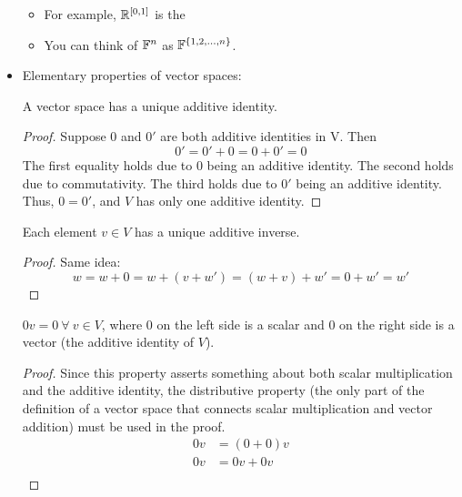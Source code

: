 \documentclass[../main.tex]{subfiles}
\begin{document}
\begin{itemize}
    \begin{itemize}
        \item For example, $\mathbb{R}^{\left[ 0,1 \right]}$ is the 
        \item You can think of $\mathbb{F}^n$ as $\mathbb{F}^{\left\{ 1,2,\dots,n\right\}}$.
    \end{itemize}
    \item Elementary properties of vector spaces:
    \begin{theorem}
        A vector space has a unique additive identity.
        \begin{proof}
            Suppose $0$ and $0'$ are both additive identities in V. Then
            \begin{equation*}
                0' = 0'+0 = 0+0' = 0
            \end{equation*}
            The first equality holds due to $0$ being an additive identity. The second holds due to commutativity. The third holds due to $0'$ being an additive identity. Thus, $0=0'$, and $V$ has only one additive identity.
        \end{proof}
    \end{theorem}
    \begin{theorem}
        Each element $v\in V$ has a unique additive inverse.
        \begin{proof}
            Same idea:
            \begin{equation*}
                w = w+0 = w+(v+w') = (w+v)+w' = 0+w' = w'
            \end{equation*}
        \end{proof}
    \end{theorem}
    \begin{theorem}
        $0v=0\ \forall\ v\in V$, where $0$ on the left side is a scalar and $0$ on the right side is a vector (the additive identity of $V$).
        \begin{proof}
            Since this property asserts something about both scalar multiplication and the additive identity, the distributive property (the only part of the definition of a vector space that connects scalar multiplication and vector addition) must be used in the proof.
            \begin{align*}
                0v &= (0+0)v\\
                0v &= 0v+0v\\

\end{align*}
\end{proof}
\end{theorem}
\end{itemize}
\end{document}
